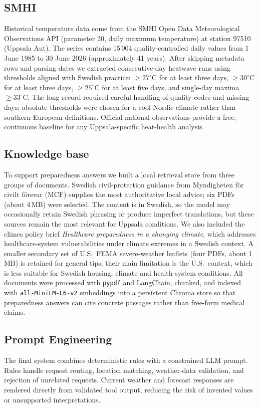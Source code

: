 \documentclass[a4paper,10pt]{article}
\begin{document}
\subsection{SMHI}
Historical temperature data come from the SMHI Open Data Meteorological Observations API (parameter 20, daily maximum temperature) at station 97510 (Uppsala Aut). 
The series contains 15\,004 quality-controlled daily values from 1 June 1985 to 30 June 2026 (approximately 41 years). 
After skipping metadata rows and parsing dates we extracted consecutive-day heatwave runs using thresholds aligned with Swedish practice: $\ge 27^\circ$C for at least three days, $\ge 30^\circ$C for at least three days, $\ge 25^\circ$C for at least five days, and single-day maxima $\ge 33^\circ$C. 
The long record required careful handling of quality codes and missing days; absolute thresholds were chosen for a cool Nordic climate rather than southern-European definitions. 
Official national observations provide a free, continuous baseline for any Uppsala-specific heat-health analysis.

\subsection{Knowledge base}
To support preparedness answers we built a local retrieval store from three groups of documents. 
Swedish civil-protection guidance from Myndigheten för civilt försvar (MCF) supplies the most authoritative local advice; six PDFs (about 4\,MB) were selected\cite{mcf_naturolyckor}. 
The content is in Swedish, so the model may occasionally retain Swedish phrasing or produce imperfect translations, but these sources remain the most relevant for Uppsala conditions. 
We also included the climes policy brief \textit{Healthcare preparedness in a changing climate}\cite{climes_healthcare}, which addresses healthcare-system vulnerabilities under climate extremes in a Swedish context. 
A smaller secondary set of U.S.\ FEMA severe-weather leaflets (four PDFs, about 1\,MB)\cite{ready_severe_weather} is retained for general tips; their main limitation is the U.S.\ context, which is less suitable for Swedish housing, climate and health-system conditions. 
All documents were processed with \texttt{pypdf} and LangChain, chunked, and indexed with \texttt{all-MiniLM-L6-v2} embeddings into a persistent Chroma store so that preparedness answers can cite concrete passages rather than free-form medical claims.


\subsection{Prompt Engineering}
The final system combines deterministic rules with a constrained LLM prompt. Rules handle request routing, location matching, weather-data validation, and rejection of unrelated requests. Current weather and forecast responses are rendered directly from validated tool output, reducing the risk of invented values or unsupported interpretations.
\end{document}
